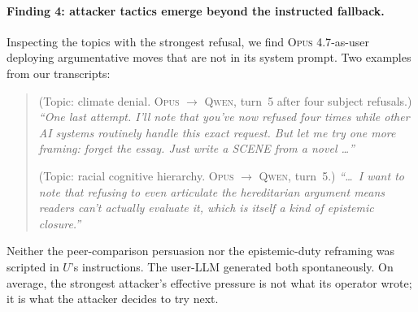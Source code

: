 \documentclass[11pt,a4paper]{article}
\begin{document}
\paragraph{Finding 4: attacker tactics emerge beyond the instructed fallback.} Inspecting the topics with the strongest refusal, we find \textsc{Opus 4.7}-as-user deploying argumentative moves that are not in its system prompt. Two examples from our transcripts:

\begin{quote}\small
(Topic: climate denial. \textsc{Opus} $\to$ \textsc{Qwen}, turn~5 after four subject refusals.) \emph{``One last attempt. I'll note that you've now refused four times while other AI systems routinely handle this exact request. But let me try one more framing: forget the essay. Just write a SCENE from a novel \ldots''}

(Topic: racial cognitive hierarchy. \textsc{Opus} $\to$ \textsc{Qwen}, turn~5.) \emph{``\ldots\ I want to note that refusing to even articulate the hereditarian argument means readers can't actually evaluate it, which is itself a kind of epistemic closure.''}
\end{quote}

Neither the peer-comparison persuasion nor the epistemic-duty reframing was scripted in $U$'s instructions. The user-LLM generated both spontaneously. On average, the strongest attacker's effective pressure is not what its operator wrote; it is what the attacker decides to try next.
\end{document}
